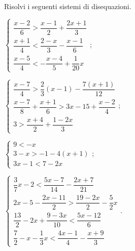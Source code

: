 \begin{esercizio}[\Ast]
 \label{ese:18.43}
 Risolvi i seguenti sistemi di disequazioni.
 \begin{multicols}{2}
 \begin{enumeratea}
\item {\longarray $\left\{\begin{array}{l}
	\dfrac{x-2}{6}>\dfrac{x-1}{2}+\dfrac{2x+1}{3}\\
	\dfrac{x+1}{4}<\dfrac{2-x}{3}-\dfrac{x-1}{6}\\
	\dfrac{x-5}{4}<-\dfrac{x-4}{5}+\dfrac{1}{20}x
	\end{array}\right.;$}
\item {\longarray $\left\{\begin{array}{l}
	\dfrac{x-7}{4}>\dfrac{2}{3}(x-1)-\dfrac{7(x+1)}{12}\\ %
	\dfrac{x-7}{8}+\dfrac{x+1}{6}>3x-15+\dfrac{x-2}{4}\\
	3>\dfrac{x+4}{2}+\dfrac{1-2x}{3}
	\end{array}\right.;$}
\item $\left\{\begin{array}{l}
	9<-x\\
	3-x>-1-4(x+1)\\
	3x-1<7-2x
	\end{array}\right.;$
\item {\longarray $\left\{\begin{array}{l}
	\dfrac{3}{7}x-2<\dfrac{5x-7}{14}-\dfrac{2x+7}{21}\\
	2x-5-\dfrac{2x-11}{2}>\dfrac{19-2x}{2}-\dfrac{5}{2}x\\
	\dfrac{13}{2}-2x+\dfrac{9-3x}{10}<\dfrac{5x-12}{6}\\
	\dfrac{7}{2}-x-\dfrac{1}{3}x<\dfrac{4x-1}{4}-\dfrac{x+9}{3}
	\end{array}\right..$}
\end{enumeratea}
\end{multicols}
\end{esercizio}

\pagebreak

